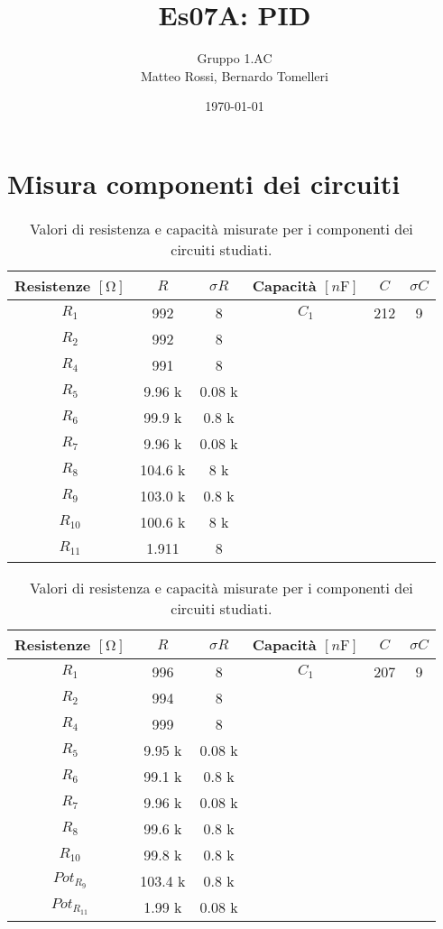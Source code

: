 \documentclass[10pt, a4paper, italian]{article}
\author{Gruppo 1.AC \\ Matteo Rossi, Bernardo Tomelleri}
\title{Es07A: PID}
\begin{document}
\date{\today}
\maketitle

\setcounter{section}{0}

\section*{Misura componenti dei circuiti}
\begin{table}[htbp]
\centering
\begin{tabular}{cccccc}
\toprule
Resistenze $[\si{\ohm}]$ & $R$ & $\sigma R$ & Capacità $[\si{n\F}]$ & $C$ &
$\sigma C$ \\
\midrule
\midrule
$R_1$	  	& 992 	& 8		& $C_1$ & 212	& 9 \\
$R_2$	  	& 992	& 8		& & & \\
$R_4$	  	& 991	& 8		& & & \\
$R_5$	  	& 9.96 k	& 0.08	k& & & \\
$R_6$	  	& 99.9 k	& 0.8	k& & & \\
$R_7$	  	& 9.96 k& 0.08	k	& & & \\
$R_8$	  	& 104.6	k& 8		k& & & \\
$R_9$	  	& 103.0	k& 0.8	k	& & & \\
$R_{10}$  	& 100.6	k& 8		k& & & \\
$R_{11}$  	& 1.911	& 8		& & & \\
\bottomrule     
\end{tabular}
\caption{Valori di resistenza e capacità misurate per i componenti dei
circuiti studiati. \label{tab: rcmes_B}}

\begin{tabular}{cccccc}
\toprule
Resistenze $[\si{\ohm}]$ & $R$ & $\sigma R$ & Capacità $[\si{n\F}]$ & $C$ &
$\sigma C$ \\
\midrule
\midrule
$R_1$	  	& 996 	& 8		& $C_1$ & 207	& 9 \\
$R_2$	  	& 994	& 8		& & & \\
$R_4$	  	& 999	& 8		& & & \\
$R_5$	  	& 9.95	k& 0.08	k& & & \\
$R_6$	  	& 99.1	k& 0.8	k& & & \\
$R_7$	  	& 9.96	k& 0.08		k& & & \\
$R_8$	  	& 99.6	k& 0.8		k& & & \\
$R_{10}$  	& 99.8	k& 0.8		k& & & \\
$Pot_{R_9}$ & 103.4 k & 0.8 k& & & \\
$Pot_{R_{11}}$ & 1.99 k & 0.08 k& & &\\
\bottomrule   
\end{tabular}
\caption{Valori di resistenza e capacità misurate per i componenti dei
circuiti studiati. \label{tab: rcmes_M}}
\end{table}
\end{document}
